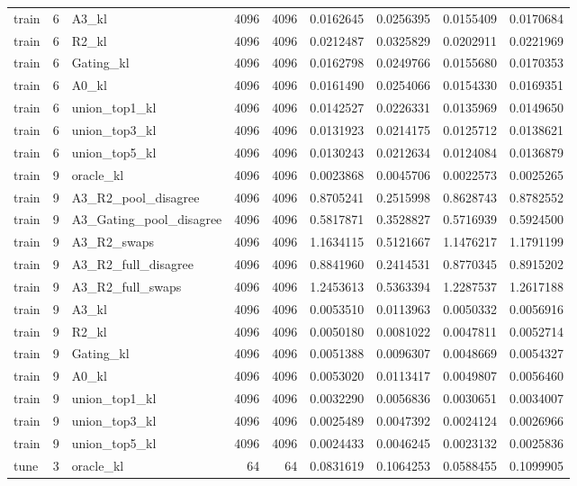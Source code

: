 \begin{tabular}{lrlrrrrrr}
train & 6 & A3_kl & 4096 & 4096 & 0.0162645 & 0.0256395 & 0.0155409 & 0.0170684 \\
train & 6 & R2_kl & 4096 & 4096 & 0.0212487 & 0.0325829 & 0.0202911 & 0.0221969 \\
train & 6 & Gating_kl & 4096 & 4096 & 0.0162798 & 0.0249766 & 0.0155680 & 0.0170353 \\
train & 6 & A0_kl & 4096 & 4096 & 0.0161490 & 0.0254066 & 0.0154330 & 0.0169351 \\
train & 6 & union_top1_kl & 4096 & 4096 & 0.0142527 & 0.0226331 & 0.0135969 & 0.0149650 \\
train & 6 & union_top3_kl & 4096 & 4096 & 0.0131923 & 0.0214175 & 0.0125712 & 0.0138621 \\
train & 6 & union_top5_kl & 4096 & 4096 & 0.0130243 & 0.0212634 & 0.0124084 & 0.0136879 \\
train & 9 & oracle_kl & 4096 & 4096 & 0.0023868 & 0.0045706 & 0.0022573 & 0.0025265 \\
train & 9 & A3_R2_pool_disagree & 4096 & 4096 & 0.8705241 & 0.2515998 & 0.8628743 & 0.8782552 \\
train & 9 & A3_Gating_pool_disagree & 4096 & 4096 & 0.5817871 & 0.3528827 & 0.5716939 & 0.5924500 \\
train & 9 & A3_R2_swaps & 4096 & 4096 & 1.1634115 & 0.5121667 & 1.1476217 & 1.1791199 \\
train & 9 & A3_R2_full_disagree & 4096 & 4096 & 0.8841960 & 0.2414531 & 0.8770345 & 0.8915202 \\
train & 9 & A3_R2_full_swaps & 4096 & 4096 & 1.2453613 & 0.5363394 & 1.2287537 & 1.2617188 \\
train & 9 & A3_kl & 4096 & 4096 & 0.0053510 & 0.0113963 & 0.0050332 & 0.0056916 \\
train & 9 & R2_kl & 4096 & 4096 & 0.0050180 & 0.0081022 & 0.0047811 & 0.0052714 \\
train & 9 & Gating_kl & 4096 & 4096 & 0.0051388 & 0.0096307 & 0.0048669 & 0.0054327 \\
train & 9 & A0_kl & 4096 & 4096 & 0.0053020 & 0.0113417 & 0.0049807 & 0.0056460 \\
train & 9 & union_top1_kl & 4096 & 4096 & 0.0032290 & 0.0056836 & 0.0030651 & 0.0034007 \\
train & 9 & union_top3_kl & 4096 & 4096 & 0.0025489 & 0.0047392 & 0.0024124 & 0.0026966 \\
train & 9 & union_top5_kl & 4096 & 4096 & 0.0024433 & 0.0046245 & 0.0023132 & 0.0025836 \\
tune & 3 & oracle_kl & 64 & 64 & 0.0831619 & 0.1064253 & 0.0588455 & 0.1099905 \\

\end{tabular}
